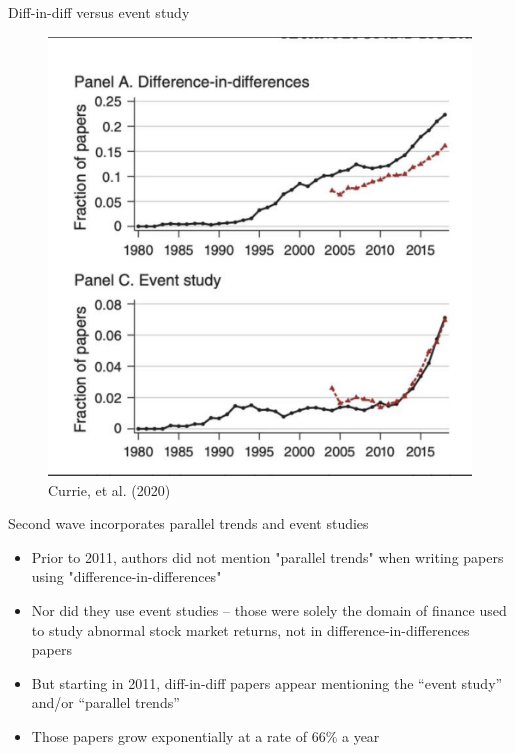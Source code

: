 \documentclass{beamer}
\begin{document}
\begin{frame}{Diff-in-diff versus event study}

	\begin{figure}
	\caption{Currie, et al. (2020)}
	\includegraphics[scale=0.25]{./lecture_includes/secondwave.png}
	\end{figure}


\end{frame}

\begin{frame}{Second wave incorporates parallel trends and event studies}

\begin{itemize}

\item Prior to 2011, authors did not mention "parallel trends" when writing papers using "difference-in-differences"
\item Nor did they use event studies -- those were solely the domain of finance used to study abnormal stock market returns, not in difference-in-differences papers
\item But starting in 2011, diff-in-diff papers appear mentioning the ``event study'' and/or ``parallel trends''
\item Those papers grow exponentially at a rate of 66\% a year
\end{itemize}

\end{frame}
\end{document}
